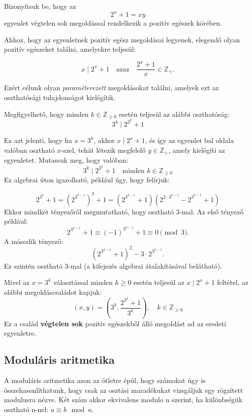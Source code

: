 \begin{problem}
	Bizonyítsuk be, hogy az 
	\[
	2^{x}+1=xy
	\]
	egyenlet végtelen sok megoldással rendelkezik a pozitív egészek körében.
\end{problem}
\begin{solution}
	Ahhoz, hogy az egyenletnek pozitív egész megoldásai legyenek, elegendő
	olyan pozitív egészeket találni, amelyekre teljesül:
	
	\[
	x\mid2^{x}+1\quad\text{azaz}\quad\frac{2^{x}+1}{x}\in\mathbb{Z}_{+}.
	\]
	
	
	Ezért célunk olyan \emph{paraméterezett} megoldásokat találni, amelyek
	ezt az oszthatósági tulajdonságot kielégítik. 
	\item[] Megfigyelhető, hogy minden $k\in\mathbb{Z}_{\geq0}$ esetén teljesül
	az alábbi oszthatóság:
	\[
	3^{k}\mid2^{3^{k}}+1
	\]
	
	Ez azt jelenti, hogy ha $x=3^{k}$, akkor $x\mid2^{x}+1$, és így
	az egyenlet bal oldala valóban osztható $x$-szel, tehát létezik megfelelő
	$y\in\mathbb{Z}_{+}$, amely kielégíti az egyenletet.
	Mutassuk meg, hogy valóban:
	\[
	3^{k}\mid2^{3^{k}}+1\quad\text{minden }k\in\mathbb{Z}_{\geq0}
	\]
	Ez algebrai úton igazolható, például úgy, hogy felírjuk:
	
	\[
	2^{3^{k}}+1=\left(2^{3^{k-1}}\right)^{3}+1=\left(2^{3^{k-1}}+1\right)\left(2^{2\cdot3^{k-1}}-2^{3^{k-1}}+1\right)
	\]
	Ekkor mindkét tényezőről megmutatható, hogy osztható 3-mal. Az első
	tényező például: 
	\[
	2^{3^{k-1}}+1\equiv(-1)^{3^{k-1}}+1\equiv0\pmod 3.
	\]
	A második tényező: 
	\[
	(2^{3^{k-1}}+1)^{2}-3\cdot2^{3^{k-1}}.
	\]
	Ez szintén osztható 3-mal (a kifejezés algebrai átalakításával belátható).
	
	
	Mivel az $x=3^{k}$ választással minden $k\geq0$ esetén teljesül
	az $x\mid2^{x}+1$ feltétel, az alábbi megoldáscsaládot kapjuk:
	\[
	(x,y)=\left(3^{k},\frac{2^{3^{k}}+1}{3^{k}}\right),\quad k\in\mathbb{Z}_{\geq0}
	\]
	Ez a család \textbf{végtelen sok} pozitív egészekből álló megoldást
	ad az eredeti egyenletre.
\end{solution}

\subsection*{Moduláris aritmetika}

A moduláris aritmetika azon az ötletre épül, hogy számokat úgy is
összehasonlíthatunk, hogy csak az osztási maradékukat vizsgáljuk egy
rögzített modulusra nézve. Két szám akkor ekvivalens modulo n szerint,
ha különbségük osztható n-nel: $a\equiv b\mod n$.

